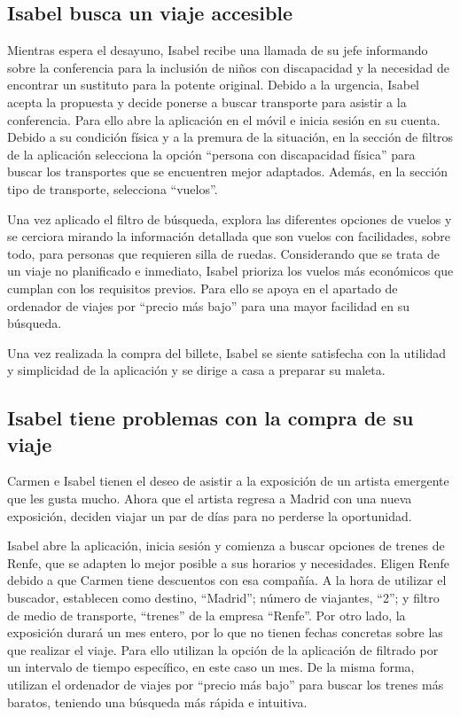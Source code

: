 \subsection{Isabel busca un viaje accesible}

Mientras espera el desayuno, Isabel recibe una llamada de su jefe informando sobre la conferencia para la inclusión de niños con discapacidad y la necesidad de encontrar un sustituto para la potente original. Debido a la urgencia, Isabel acepta la propuesta y decide ponerse a buscar transporte para asistir a la conferencia. Para ello abre la aplicación en el móvil e inicia sesión en su cuenta. Debido a su condición física y a la premura de la situación, en la sección de filtros de la aplicación selecciona la opción “persona con discapacidad física” para buscar los transportes que se encuentren mejor adaptados. Además, en la sección tipo de transporte, selecciona “vuelos”.

Una vez aplicado el filtro de búsqueda, explora las diferentes opciones de vuelos y se cerciora mirando la información detallada que son vuelos con facilidades, sobre todo, para personas que requieren silla de ruedas.
Considerando que se trata de un viaje no planificado e inmediato, Isabel prioriza los vuelos más económicos que cumplan con los requisitos previos. Para ello se apoya en el apartado de  ordenador de viajes por “precio más bajo” para una mayor facilidad en su búsqueda.

Una vez realizada la compra del billete, Isabel se siente satisfecha con la utilidad y simplicidad de la aplicación y se dirige a casa a preparar su maleta.

\subsection{Isabel tiene problemas con la compra de su viaje}

Carmen e Isabel tienen el deseo de asistir a la exposición de un artista emergente que les gusta mucho. Ahora que el artista regresa a Madrid con una nueva exposición, deciden viajar un par de días para no perderse la oportunidad.

Isabel abre la aplicación, inicia sesión y comienza a buscar opciones de trenes de Renfe, que se adapten lo mejor posible a sus horarios y necesidades. Eligen Renfe debido a que Carmen tiene descuentos con esa compañía. A la hora de utilizar el buscador, establecen como destino, “Madrid”; número de viajantes, “2”; y filtro de medio de transporte, “trenes” de la empresa “Renfe”. 
Por otro lado, la exposición durará un mes entero, por lo que no tienen fechas concretas sobre las que realizar el viaje. Para ello utilizan la opción de la aplicación de filtrado por un intervalo de tiempo específico, en este caso un mes. De la misma forma, utilizan el ordenador de viajes por “precio más bajo” para buscar los trenes más baratos, teniendo una búsqueda más rápida e intuitiva.

